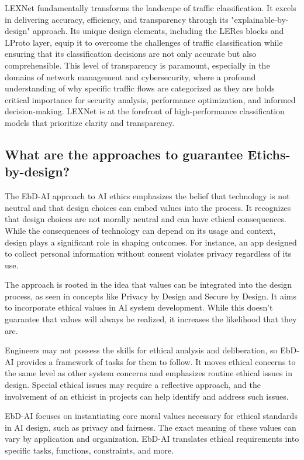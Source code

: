 \documentclass{article}
\begin{document}
LEXNet fundamentally transforms the landscape of traffic classification. It excels in delivering accuracy, efficiency, and transparency through its "explainable-by-design" approach. Its unique design elements, including the LERes blocks and LProto layer, equip it to overcome the challenges of traffic classification while ensuring that its classification decisions are not only accurate but also comprehensible. This level of transparency is paramount, especially in the domains of network management and cybersecurity, where a profound understanding of why specific traffic flows are categorized as they are holds critical importance for security analysis, performance optimization, and informed decision-making. LEXNet is at the forefront of high-performance classification models that prioritize clarity and transparency.

\newpage

\subsection{What are the approaches to guarantee Etichs-by-design?}

The EbD-AI approach to AI ethics emphasizes the belief that technology \cite{articleebd} is not neutral and that design choices can embed values into the process. It recognizes that design choices are not morally neutral and can have ethical consequences. While the consequences of technology can depend on its usage and context, design plays a significant role in shaping outcomes. For instance, an app designed to collect personal information without consent violates privacy regardless of its use.  

The approach is rooted in the idea that values can be integrated into the design process, as seen in concepts like Privacy by Design and Secure by Design. It aims to incorporate ethical values in AI system development. While this doesn't guarantee that values will always be realized, it increases the likelihood that they are.  

Engineers may not possess the skills for ethical analysis and deliberation, so EbD-AI provides a framework of tasks for them to follow. It moves ethical concerns to the same level as other system concerns and emphasizes routine ethical issues in design. Special ethical issues may require a reflective approach, and the involvement of an ethicist in projects can help identify and address such issues.  

EbD-AI focuses on instantiating core moral values necessary for ethical standards in AI design, such as privacy and fairness. The exact meaning of these values can vary by application and organization. EbD-AI translates ethical requirements into specific tasks, functions, constraints, and more.  
\end{document}

